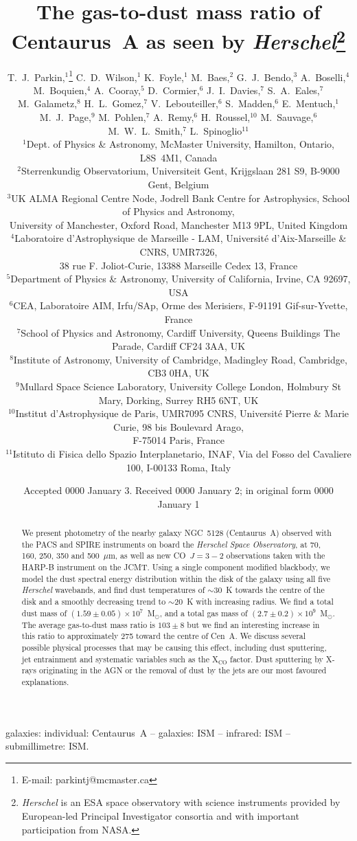 \documentclass[useAMS,usenatbib,usegraphicx]{mn2e}
\title[The gas-to-dust mass ratio of Cen~A as seen by \emph{Herschel}]{The gas-to-dust mass ratio of Centaurus~A as seen by \emph{Herschel}\thanks{\emph{Herschel} is an ESA space observatory with science instruments provided by European-led Principal Investigator consortia and with important participation from NASA.}}
\author[T. J. Parkin et al.]{T.~J.~Parkin,$^{1}$\thanks{E-mail: parkintj@mcmaster.ca} C.~D.~Wilson,$^{1}$ K.~Foyle,$^{1}$ M.~Baes,$^{2}$ G.~J.~Bendo,$^{3}$ A.~Boselli,$^{4}$   
\newauthor
M.~Boquien,$^{4}$ A.~Cooray,$^{5}$ D.~Cormier,$^{6}$ J.~I.~Davies,$^{7}$ S.~A.~Eales,$^{7}$
\newauthor
 M.~Galametz,$^{8}$ H.~L.~Gomez,$^{7}$ V.~Lebouteiller,$^{6}$ S.~Madden,$^{6}$ E.~Mentuch,$^{1}$
\newauthor
 M.~J.~Page,$^{9}$ M.~Pohlen,$^{7}$ A.~Remy,$^{6}$ H.~Roussel,$^{10}$ M.~Sauvage,$^{6}$ 
\newauthor
 M.~W.~L.~Smith,$^{7}$ L.~Spinoglio$^{11}$\\
    $^{1}$Dept. of Physics \& Astronomy, McMaster University, Hamilton, Ontario, L8S~4M1, Canada\\
    $^{2}$Sterrenkundig Observatorium, Universiteit Gent, Krijgslaan 281 S9,  
    B-9000 Gent, Belgium \\
    $^{3}$UK ALMA Regional Centre Node, Jodrell Bank Centre for Astrophysics, School of Physics and Astronomy, \\
    University of Manchester, Oxford Road, Manchester M13 9PL, United Kingdom \\
    $^{4}$Laboratoire d'Astrophysique de Marseille - LAM, Universit\'e d'Aix-Marseille \& CNRS, UMR7326, \\ 38 rue F. Joliot-Curie, 13388 Marseille Cedex 13, France  \\
    $^{5}$Department of Physics \& Astronomy, University of California, Irvine,
    CA 92697, USA \\
    $^{6}$CEA, Laboratoire AIM, Irfu/SAp, Orme des Merisiers, F-91191 Gif-sur-Yvette, France \\
    $^{7}$School of Physics and Astronomy, Cardiff University, Queens Buildings The Parade, Cardiff CF24 3AA, UK \\
    $^{8}$Institute of Astronomy, University of Cambridge, Madingley Road, Cambridge, CB3 0HA, UK \\
    $^{9}$Mullard Space Science Laboratory, University College London, Holmbury St Mary, Dorking, Surrey RH5 6NT, UK\\
    $^{10}$Institut d'Astrophysique de Paris, UMR7095 CNRS, Universit\'e Pierre \& Marie Curie, 98 bis Boulevard Arago, \\
    F-75014 Paris, France \\    
    $^{11}$Istituto di Fisica dello Spazio Interplanetario, INAF, Via del Fosso  
    del Cavaliere 100, I-00133 Roma, Italy \\
}
\begin{document}
 
\date{Accepted 0000 January 3. Received 0000 January 2; in original form 0000 January 1}

\pagerange{\pageref{firstpage}--\pageref{lastpage}} 

\maketitle

\label{firstpage}

\begin{abstract}
We present photometry of the nearby galaxy NGC~5128 (Centaurus~A) observed with the PACS and SPIRE instruments on board the \emph{Herschel Space Observatory}, at 70, 160, 250, 350 and 500~$\mu$m, as well as new CO~$J=3-2$ observations taken with the HARP-B instrument on the JCMT.  Using a single component modified blackbody, we model the dust spectral energy distribution within the disk of the galaxy using all five \emph{Herschel} wavebands, and find dust temperatures of $\sim 30$~K towards the centre of the disk and a smoothly decreasing trend to $\sim 20$~K with increasing radius.  We find a total dust mass of $(1.59 \pm 0.05) \times 10^{7}$~M$_{\odot}$, and a total gas mass of $(2.7 \pm 0.2)\times 10^{9}$~M$_{\odot}$.  The average gas-to-dust mass ratio is $103 \pm 8$ but we find an interesting increase in this ratio to approximately 275 toward the centre of Cen~A.  We discuss several possible physical processes that may be causing this effect, including dust sputtering, jet entrainment and systematic variables such as the X$_{\mathrm{CO}}$ factor.  Dust sputtering by X-rays originating in the AGN or the removal of dust by the jets are our most favoured explanations.
\end{abstract}

\begin{keywords}
galaxies: individual: Centaurus~A -- galaxies: ISM -- infrared: ISM -- submillimetre: ISM.
\end{keywords}
\end{document}
